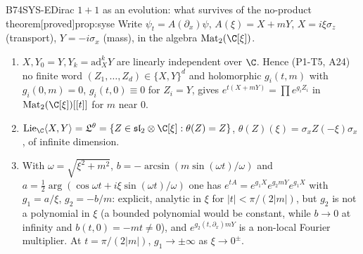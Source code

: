 \documentclass[11pt,a4paper,oneside]{report}
\newcommand{\badge}[2]{\textcolor{#1}{\textsf{\footnotesize[#2]}}}
\newcommand{\proved}{\badge{cC}{proved}}
\newenvironment{dimcard}[5]{\par\Needspace{12\baselineskip}\begin{dimcardbox}{#1}{#2}{#3}{#4}{#5}}{\end{dimcardbox}}
\begin{document}
\begin{dimcard}{B74}{SYS-E}{Dirac $1+1$ as an evolution: what survives of the no-product theorem}{\proved}{prop:syse}
Write $\psi_t=A(\partial_x)\psi$, $A(\xi)=X+mY$, $X=i\xi\sigma_z$ (transport), $Y=-i\sigma_x$ (mass), in the algebra $\mathrm{Mat}_2(\C[\xi])$.
\begin{enumerate}[label=(E\arabic*)]
\item $X,Y_0=Y,Y_k=\mathrm{ad}_X^kY$ are linearly independent over $\C$. Hence (P1-T5, A24) no finite word $(Z_1,\dots,Z_d)\in\{X,Y\}^d$ and holomorphic $g_i(t,m)$ with $g_i(0,m)=0$, $g_i(t,0)\equiv0$ for $Z_i=Y$, gives $e^{t(X+mY)}=\prod e^{g_iZ_i}$ in $\mathrm{Mat}_2(\C[\xi])[[t]]$ for $m$ near $0$.
\item $\mathrm{Lie}_\C\langle X,Y\rangle=\mathfrak L^\theta=\{Z\in\mathfrak{sl}_2\otimes\C[\xi]:\theta(Z)=Z\}$, $\theta(Z)(\xi)=\sigma_xZ(-\xi)\sigma_x$, of infinite dimension.
\item With $\omega=\sqrt{\xi^2+m^2}$, $b=-\arcsin(m\sin(\omega t)/\omega)$ and $a=\frac12\arg(\cos\omega t+i\xi\sin(\omega t)/\omega)$ one has $e^{tA}=e^{g_1X}e^{g_2mY}e^{g_1X}$ with $g_1=a/\xi$, $g_2=-b/m$: explicit, analytic in $\xi$ for $|t|<\pi/(2|m|)$, but $g_2$ is not a polynomial in $\xi$ (a bounded polynomial would be constant, while $b\to0$ at infinity and $b(t,0)=-mt\ne0$), and $e^{g_2(t,\partial_x)mY}$ is a non-local Fourier multiplier. At $t=\pi/(2|m|)$, $g_1\to\pm\infty$ as $\xi\to0^\pm$.
\end{enumerate}
\end{dimcard}
\end{document}
